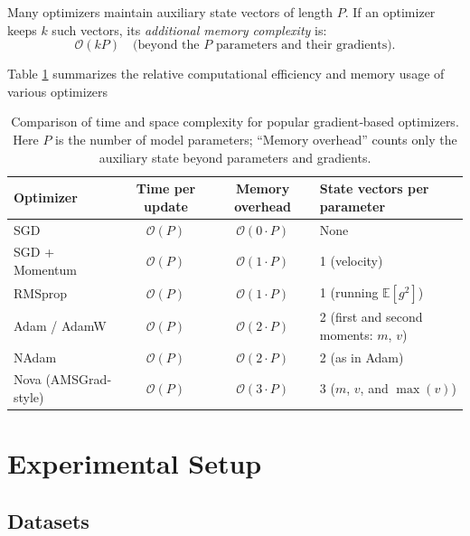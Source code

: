 \documentclass{article}
\begin{document}
Many optimizers maintain auxiliary state vectors of length $P$.  If an optimizer keeps $k$ such vectors, its \emph{additional memory complexity} is:
\[
  \mathcal{O}(kP)
  \quad\text{(beyond the $P$ parameters and their gradients).}
\]

Table \ref{tab:optimizer-complexity} summarizes the relative computational efficiency and memory usage of various optimizers

\begin{table}[H]
  \centering
  \caption{
    Comparison of time and space complexity for popular gradient‐based optimizers.
    Here $P$ is the number of model parameters; “Memory overhead” counts only the auxiliary state beyond parameters and gradients.
  }
  \begin{tabular}{@{}l c c l@{}}
    \toprule
    \textbf{Optimizer}        & \textbf{Time per update} & \textbf{Memory overhead} & \textbf{State vectors per parameter} \\
    \midrule
    SGD                       & $\mathcal O(P)$          & $\mathcal O(0\cdot P)$   & None \\
    SGD + Momentum            & $\mathcal O(P)$          & $\mathcal O(1\cdot P)$   & 1 (velocity) \\
    RMSprop                   & $\mathcal O(P)$          & $\mathcal O(1\cdot P)$   & 1 (running $\mathbb{E}[g^2]$) \\
    Adam / AdamW              & $\mathcal O(P)$          & $\mathcal O(2\cdot P)$   & 2 (first and second moments: $m$, $v$) \\
    NAdam                      & $\mathcal O(P)$          & $\mathcal O(2\cdot P)$   & 2 (as in Adam) \\
    Nova (AMSGrad‐style)      & $\mathcal O(P)$          & $\mathcal O(3\cdot P)$   & 3 ($m$, $v$, and $\max(v)$) \\
    \bottomrule
  \end{tabular}
  
  \label{tab:optimizer-complexity}
\end{table}







\section{Experimental Setup}\label{Sec 4}




 \subsection{Datasets}
 
\end{document}
